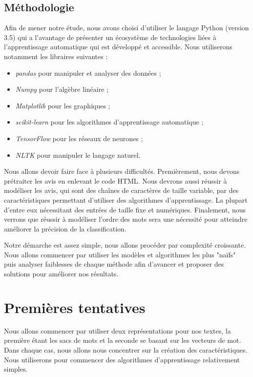 \documentclass{article}
\begin{document}
\subsection{Méthodologie}

Afin de mener notre étude, nous avons choisi d'utiliser le langage Python (version 3.5) qui a l'avantage de présenter un écosystème de technologies liées à l'apprentissage automatique qui est développé et accessible. Nous utiliserons notamment les libraires suivantes :
\begin{itemize}
	\item \textit{pandas} pour manipuler et analyser des données ;
	\item \textit{Numpy} pour l'algèbre linéaire ; 
	\item \textit{Matplotlib} pour les graphiques ;
	\item \textit{scikit-learn} pour les algorithmes d'apprentissage automatique ;
	\item \textit{TensorFlow} pour les réseaux de neurones ;
	\item \textit{NLTK} pour manipuler le langage naturel.
\end{itemize}

Nous allons devoir faire face à plusieurs difficultés. Premièrement, nous devons prétraiter les avis en enlevant le code HTML. Nous devrons aussi réussir à modéliser les avis, qui sont des chaînes de caractères de taille variable, par des caractéristiques permettant d'utiliser des algorithmes d'apprentissage. La plupart d'entre eux nécessitant des entrées de taille fixe et numériques. Finalement, nous verrons que réussir à modéliser l'ordre des mots sera une nécessité pour atteindre améliorer la précision de la classification.

Notre démarche est assez simple, nous allons procéder par complexité croissante. Nous allons commencer par utiliser les modèles et algorithmes les plus "naïfs" puis analyser faiblesses de chaque  méthode afin d'avancer et proposer des solutions pour améliorer nos résultats.

\section{Premières tentatives}

Nous allons commencer par utiliser deux représentations pour nos textes, la première étant les sacs de mots et la seconde se basant sur les vecteurs de mot. Dans chaque cas, nous allons nous concentrer sur la création des caractéristiques. Nous utiliserons pour commencer des algorithmes d'apprentissage relativement simples.
\end{document}
